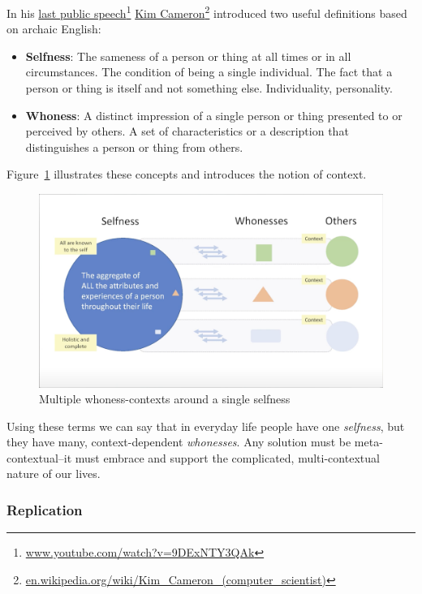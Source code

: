 \documentclass[11pt, oneside]{article}   	%
\newcommand{\hyperfootnote}[1][]{\def\ArgI{{#1}}\hyperfootnoteRelay}
\newcommand\hyperfootnoteRelay[2][]{\href{#1#2}{\ArgI}\footnote{\href{#1#2}{#2}}}
\begin{document}
In his \hyperfootnote[last public speech][https://]{www.youtube.com/watch?v=9DExNTY3QAk}  
\hyperfootnote[Kim Cameron][https://]{en.wikipedia.org/wiki/Kim\_Cameron\_(computer\_scientist)} introduced two useful definitions based on archaic English:

\begin{itemize}
\item \textbf{Selfness}: The sameness of a person or thing at all times or in all circumstances. The condition of being a single individual. The fact that a person or thing is itself and not something else. Individuality, personality. 
\item \textbf{Whoness}: A distinct impression of a single person or thing presented to or perceived by others. A set of characteristics or a description that distinguishes a person or thing from others. 
\end{itemize}

Figure~\ref{fig:multiple-contexts} illustrates these concepts and introduces the notion of context.

\begin{figure}[htbp]
\includegraphics[width=\textwidth]{./images/selfness-and-whoness-larger.png}
\caption{Multiple whoness-contexts around a single selfness}
\label{fig:multiple-contexts}
\end{figure}

Using these terms we can say that in everyday life people have one \emph{selfness}, but they have many, context-dependent \emph{whonesses}. Any solution must be meta-contextual--it must embrace and support the complicated, multi-contextual nature of our lives.

\subsubsection{Replication}
\end{document}
